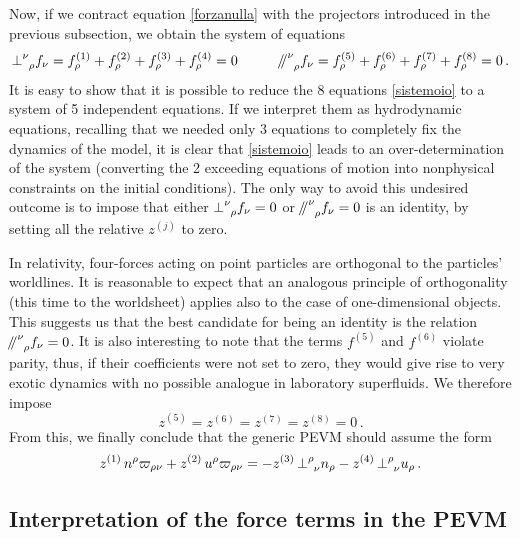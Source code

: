 \documentclass[preprints,article,accept,moreauthors,pdftex]{mdpi}
\newcommand{\spc}{\quad \quad \quad}
\newcommand{\paral}{\mathbin{\!/\mkern-5mu/\!}}
\begin{document}
Now, if we contract equation \eqref{forzanulla} with the projectors introduced in the previous subsection, we obtain the system of equations
\begin{equation}\label{sistemoio}
   {\perp}\indices{^\nu _\rho} f_\nu = f^{(1)}_\rho + f^{(2)}_\rho +f^{(3)}_\rho+f^{(4)}_\rho =0 
  \spc  
   {\paral \,}\indices{^\nu _\rho} f_\nu = f^{(5)}_\rho + f^{(6)}_\rho +f^{(7)}_\rho +f^{(8)}_\rho =0 \, . 
\end{equation}
It is easy to show that it is possible to reduce the 8 equations \eqref{sistemoio} to a system of 5 independent equations. If we interpret them as hydrodynamic equations, recalling that we needed only 3 equations to completely fix the dynamics of the model, it is clear that \eqref{sistemoio} leads to an over-determination of the system (converting the 2 exceeding equations of motion into nonphysical constraints on the initial conditions). The only way to avoid this undesired outcome is to impose that either ${\perp}\indices{^\nu _\rho} f_\nu =0$ or ${\paral \,}\indices{^\nu _\rho} f_\nu =0$ is an identity, by setting all the relative $z^{(j)}$ to zero. 

In relativity, four-forces acting on point particles are orthogonal to the particles' worldlines. It is reasonable to expect that an analogous principle of orthogonality (this time to the worldsheet) applies also to the case of one-dimensional objects. This suggests us that the best candidate for being an identity is the relation ${\paral \,}\indices{^\nu _\rho} f_\nu =0$. It is also interesting to note that the terms $f^{(5)}$ and $f^{(6)}$ violate parity, thus, if their coefficients were not set to zero, they would give rise to very exotic dynamics with no possible analogue in laboratory superfluids. We therefore impose
\begin{equation}
z^{(5)}=z^{(6)}=z^{(7)}=z^{(8)}=0 \, .
\end{equation}
From this, we finally conclude that the generic PEVM should assume the form
\begin{equation}
\label{generaleBuf}
z^{(1)} \, n^\rho \varpi_{ \rho \nu} + z^{(2)}  \, u^\rho \varpi_{ \rho \nu} =  -z^{(3)} \, {\perp}\indices{^\rho _\nu} n_\rho - z^{(4)} \,  {\perp}\indices{^\rho _\nu} u_\rho \, .
\end{equation}

\subsection{Interpretation of the force terms in the PEVM}
\end{document}
